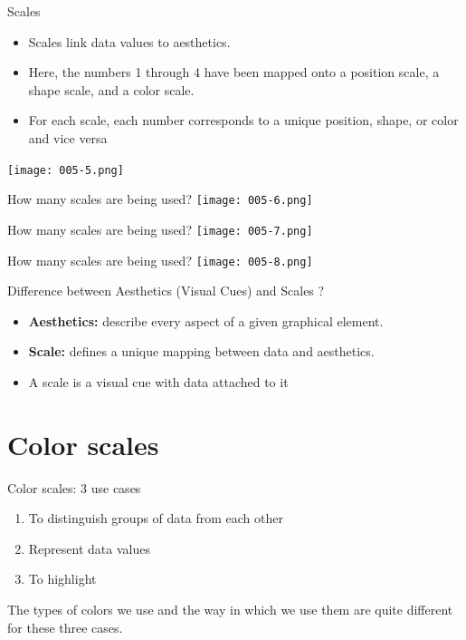 \documentclass[10pt]{beamer}\usepackage[]{graphicx}\usepackage[]{color}
\begin{document}
	\begin{frame}{Scales}
		\begin{itemize}
			\item Scales link data values to aesthetics. 
			\item Here, the numbers 1 through 4 have been mapped onto a position scale, a shape scale, and a color scale. 
			\item For each scale, each number corresponds to a unique position, shape, or color and vice versa
		\end{itemize}
	\centering
	\texttt{[image: 005-5.png]}
\end{frame}


	\begin{frame}{How many scales are being used?}
	\centering
	\texttt{[image: 005-6.png]}
\end{frame}

	\begin{frame}{How many scales are being used?}
	\centering
	\texttt{[image: 005-7.png]}
\end{frame}

	\begin{frame}{How many scales are being used?}
	\centering
	\texttt{[image: 005-8.png]}
\end{frame}


\begin{frame}{Difference between Aesthetics (Visual Cues) and Scales ?}
\begin{itemize}
	\item \textbf{Aesthetics:} describe every aspect of a given graphical element.
	\item \textbf{Scale:} defines a unique mapping between data and aesthetics.
	\item A scale is a visual cue with data attached to it
	
\end{itemize}
\end{frame}


\section{Color scales}

\begin{frame}{Color scales: 3 use cases}
	\begin{enumerate}
		\item To distinguish groups of data from each other
		\item Represent data values
		\item To highlight
	\end{enumerate}

\vspace{0.2in}
		The types of colors we use and the way in which we use them are quite different for these three cases.
\end{frame}
\end{document}
